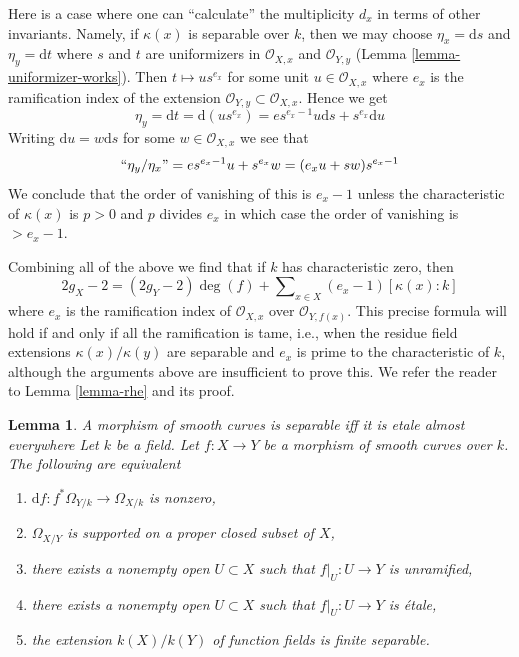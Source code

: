 \documentclass{stacks-project}
\newenvironment{slogan}{\comment}{\endcomment}
\theoremstyle{plain}
\newtheorem{lemma}[subsection]{Lemma}
\theoremstyle{definition}
\theoremstyle{remark}
\numberwithin{equation}{subsection}
\begin{document}
\medskip\noindent
Here is a case where one can ``calculate'' the multiplicity $d_x$ in terms
of other invariants. Namely, if $\kappa(x)$ is separable over $k$, then
we may choose $\eta_x = \text{d}s$ and $\eta_y = \text{d}t$ where $s$
and $t$ are uniformizers in $\mathcal{O}_{X, x}$ and $\mathcal{O}_{Y, y}$
(Lemma \ref{lemma-uniformizer-works}).
Then $t \mapsto u s^{e_x}$ for some unit $u \in \mathcal{O}_{X, x}$
where $e_x$ is the ramification index of the extension
$\mathcal{O}_{Y, y} \subset \mathcal{O}_{X, x}$. Hence we get
$$
\eta_y = \text{d}t = \text{d}(u s^{e_x}) =
e s^{e_x - 1} u \text{d}s + s^{e_x} \text{d}u
$$
Writing $\text{d}u = w \text{d}s$ for some $w \in \mathcal{O}_{X, x}$
we see that
$$
``\eta_y/\eta_x" = e s^{e_x - 1} u + s^{e_x} w = (e_x u + s w)s^{e_x - 1}
$$
We conclude that the order of vanishing of this is $e_x - 1$
unless the characteristic of $\kappa(x)$ is $p > 0$ and $p$ divides $e_x$
in which case the order of vanishing is $> e_x - 1$.

\medskip\noindent
Combining all of the above we find that if $k$ has characteristic
zero, then
$$
2g_X - 2 = (2g_Y - 2)\deg(f) +
\sum\nolimits_{x \in X} (e_x - 1)[\kappa(x) : k]
$$
where $e_x$ is the ramification index of $\mathcal{O}_{X, x}$ over
$\mathcal{O}_{Y, f(x)}$. This precise formula will hold if and only
if all the ramification is tame, i.e., when the
residue field extensions $\kappa(x)/\kappa(y)$ are separable and
$e_x$ is prime to the characteristic of $k$, although the
arguments above are insufficient to prove this. We refer the reader
to Lemma \ref{lemma-rhe} and its proof.

\begin{lemma}
\label{lemma-generically-etale}
\begin{slogan}
A morphism of smooth curves is separable iff it is etale almost everywhere
\end{slogan}
Let $k$ be a field. Let $f : X \to Y$ be a morphism of smooth curves over $k$.
The following are equivalent
\begin{enumerate}
\item $\text{d}f : f^*\Omega_{Y/k} \to \Omega_{X/k}$ is nonzero,
\item $\Omega_{X/Y}$ is supported on a proper closed subset of $X$,
\item there exists a nonempty open $U \subset X$ such that
$f|_U : U \to Y$ is unramified,
\item there exists a nonempty open $U \subset X$ such that
$f|_U : U \to Y$ is \'etale,
\item the extension $k(X)/k(Y)$ of function fields is
finite separable.
\end{enumerate}
\end{lemma}
\end{document}
